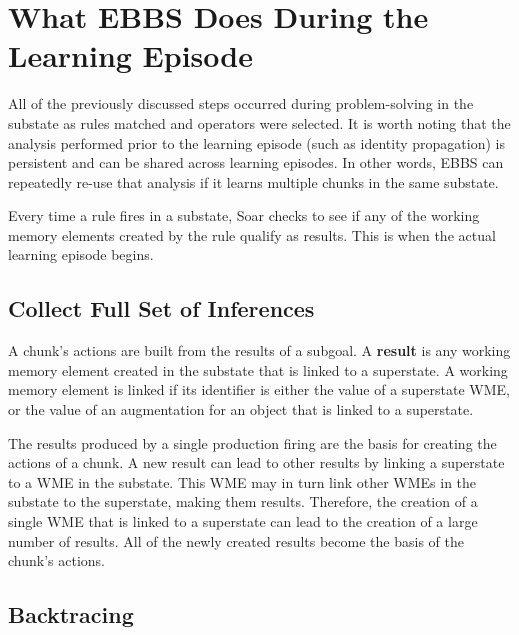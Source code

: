\section{What EBBS Does During the Learning Episode}
\label{CHUNKING-during}

All of the previously discussed steps occurred during problem-solving in the substate as rules matched and operators were selected.  It is worth noting that the analysis performed prior to the learning episode (such as identity propagation) is persistent and can be shared across learning episodes.  In other words, EBBS can repeatedly re-use that analysis if it learns multiple chunks in the same substate.

Every time a rule fires in a substate, Soar checks to see if any of the working memory elements created by the rule qualify as results.  This is when the actual learning episode begins.

\subsection{Collect Full Set of Inferences}
\label{CHUNKING-during-results}

A chunk's actions are built from the results of a subgoal. A \textbf{result} is any working memory element created in the substate that is linked to a superstate. A working memory element is linked if its identifier is either the value of a superstate WME, or the value of an augmentation for an object that is linked to a superstate.

The results produced by a single production firing are the basis for creating the actions of a chunk. A new result can lead to other results by linking a superstate to a WME in the substate. This WME may in turn link other WMEs in the substate to the superstate, making them results. Therefore, the creation of a single WME that is linked to a superstate can lead to the creation of a large number of results. All of the newly created results become the basis of the chunk's actions.

\subsection{Backtracing}
\label{CHUNKING-during-backtracing}

